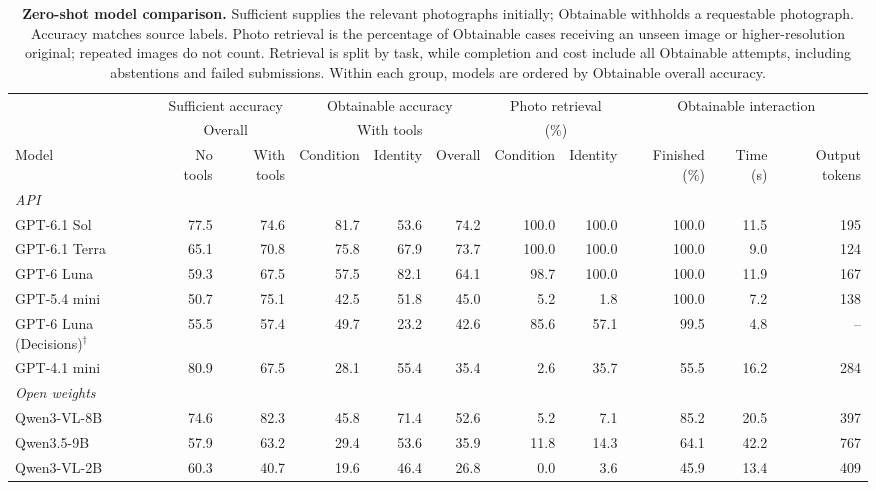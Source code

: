 \begin{table}[t]\centering\small\setlength{\tabcolsep}{2.2pt}
\begin{minipage}{.98\textwidth}\centering
\caption{\textbf{Zero-shot model comparison.} Sufficient supplies the relevant photographs initially; Obtainable withholds a requestable photograph. Accuracy matches source labels. Photo retrieval is the percentage of Obtainable cases receiving an unseen image or higher-resolution original; repeated images do not count. Retrieval is split by task, while completion and cost include all Obtainable attempts, including abstentions and failed submissions. Within each group, models are ordered by Obtainable overall accuracy.}
\label{tab:benchmark}
\begin{tabular}{@{}lrrrrrrrrrr@{}}\toprule
 & \multicolumn{2}{c}{Sufficient accuracy} & \multicolumn{3}{c}{Obtainable accuracy} & \multicolumn{2}{c}{Photo retrieval} & \multicolumn{3}{c}{Obtainable interaction}\\
\cmidrule(lr){2-3}\cmidrule(lr){4-6}\cmidrule(lr){7-8}\cmidrule(l){9-11}
 & \multicolumn{2}{c}{Overall} & \multicolumn{3}{c}{With tools} & \multicolumn{2}{c}{(\%)} & & &\\
Model & No tools & With tools & Condition & Identity & Overall & Condition & Identity & Finished (\%) & Time (s) & Output tokens\\\midrule
\multicolumn{11}{l}{\emph{API}}\\
GPT-6.1 Sol & 77.5 & 74.6 & 81.7 & 53.6 & 74.2 & 100.0 & 100.0 & 100.0 & 11.5 & 195\\
GPT-6.1 Terra & 65.1 & 70.8 & 75.8 & 67.9 & 73.7 & 100.0 & 100.0 & 100.0 & 9.0 & 124\\
GPT-6 Luna & 59.3 & 67.5 & 57.5 & 82.1 & 64.1 & 98.7 & 100.0 & 100.0 & 11.9 & 167\\
GPT-5.4 mini & 50.7 & 75.1 & 42.5 & 51.8 & 45.0 & 5.2 & 1.8 & 100.0 & 7.2 & 138\\
GPT-6 Luna (Decisions)$^{\dagger}$ & 55.5 & 57.4 & 49.7 & 23.2 & 42.6 & 85.6 & 57.1 & 99.5 & 4.8 & --\\
GPT-4.1 mini & 80.9 & 67.5 & 28.1 & 55.4 & 35.4 & 2.6 & 35.7 & 55.5 & 16.2 & 284\\
\midrule
\multicolumn{11}{l}{\emph{Open weights}}\\
Qwen3-VL-8B & 74.6 & 82.3 & 45.8 & 71.4 & 52.6 & 5.2 & 7.1 & 85.2 & 20.5 & 397\\
Qwen3.5-9B & 57.9 & 63.2 & 29.4 & 53.6 & 35.9 & 11.8 & 14.3 & 64.1 & 42.2 & 767\\
Qwen3-VL-2B & 60.3 & 40.7 & 19.6 & 46.4 & 26.8 & 0.0 & 3.6 & 45.9 & 13.4 & 409\\

\end{tabular}
\end{minipage}
\end{table}
